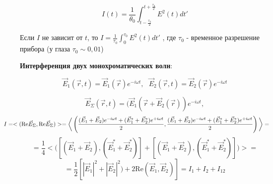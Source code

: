 \documentclass[12pt, a4paper]{report}
\begin{document}
\[ I(t ) = \frac{1}{\theta_0 } \int_{t - \frac{\tau_0}{2 } }^{t + \frac{\tau_0 }{2 } } E ^2 (t ) d t '    \] 

Если \( I  \)  не зависит от \( t  \), то \(\displaystyle  I = \frac{1}{\tau_0 } \int_{0 }^{\tau_0 } E ^2 (t ) dt '    \)  
, где \( \tau_0  \) - временное разрешение прибора (у глаза \( \tau_0   \sim 0,01 \))

\textbf{Интерференция двух монохроматических волн}: 

\[ \vec{E }_1 (\vec{r },t    ) = \vec{E }  _1 (\vec{r } ) e^{ - i \omega t } , \text{ } \vec{E } _2 (\vec{r }  ,t ) = \vec{E }  _2 (\vec{r }  ) e ^{ - i \omega t }   \] 

\[ \vec{E } _{\Sigma } (\vec{r } ,t ) = (\vec{E }  _1 (\vec{r }  + \vec{E }  _2 (\vec{r } )) e^{ - i \omega t } ,  \] 
\[ \kern-1 cm I = <(\mathrm{Re }  \vec{E } _{\Sigma } , \mathrm{Re } \vec{E } _{\Sigma}    )>  = \bigg<\left( \frac{(\vec{E } _1 + \vec{E }  _2 )e^{ -i \omega t } + (\vec{E } _1 ^ * + \vec{E }  _2 ^ * ) e^{ + i \omega t }  }{2} ,\frac{(\vec{E } _1 + \vec{E }  _2 )e^{ -i \omega t } + (\vec{E } _1 ^ * + \vec{E }  _2 ^ * ) e^{ + i \omega t }  }{2} \right) \bigg> =\] 
\[ = \frac{1}{4 }  \bigg < \bigg ( [(\vec{E } _1 + \vec{E }  _2  ) , (\vec{E } _1 ^ * + \vec{E } _2 ^ *)] + [(\vec{E } _1 + \vec{E }  _2  ), (\vec{E } _1 ^ * + \vec{E } _2 ^ *)] \bigg) \bigg > =\]  
\[= \frac{1}{2 }  \left[  |  \vec{E } _1       | ^2 + |  \vec{E } _2  | ^2 ) + 2 \mathrm{Re }  (\vec{E } _1 , \vec{E }  _2 ) \right] = I_1 + I_2 + I_{12} \] 

\ifdefined\mainfile
\else
    
\end{document}
